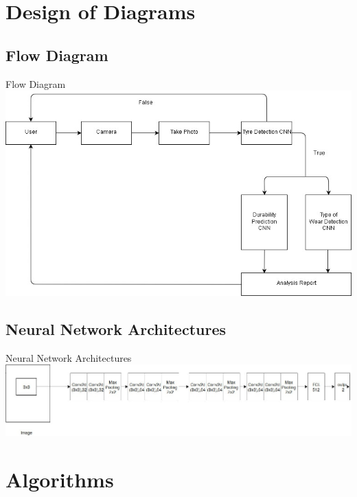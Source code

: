 \documentclass{beamer}
\begin{document}
\section{Design of Diagrams}

\subsection{Flow Diagram}
\begin{frame}{Flow Diagram}
\includegraphics[scale=0.37]{second.jpg}
\end{frame}

\subsection{Neural Network Architectures}
\begin{frame}{Neural Network Architectures}
\includegraphics[scale=0.33]{arch.png}
\end{frame}

\section{Algorithms}
\end{document}

